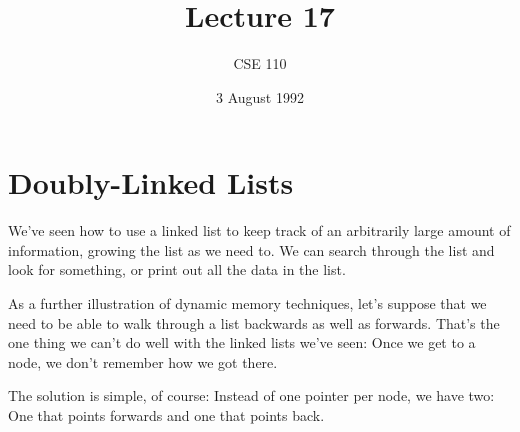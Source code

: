 %
%
%


\def\brac#1{$<${#1}$>$}
\def\Int{{\tt int}}
\def\int{\brac{\Int}}
\def\int{\brac{\Int}}
\def\Shortint{{\tt short~int}}
\def\shortint{\brac{\Shortint}}
\def\Longint{{\tt long~int}}
\def\longint{\brac{\Longint}}
\def\Float{{\tt float}}
\def\float{\brac{\Float}}
\def\Double{{\tt double}}
\def\double{\brac{\Double}}
\def\Char{{\tt char}}
\def\chr{\brac{\Char}}
\def\Void{{\tt void}}
\def\void{\brac{\Void}}

\def\ptr#1{pointer~to {#1}}
\def\p2#1{\brac{\ptr{#1}}}
\def\Ano#1#2{array~of {#1}~{#2}s}
\def\ano#1#2{\brac{\Ano{#1}{#2}}}
\def\Ao#1{array~of {#1}}
\def\ao#1{\brac{\Ao#1}}

\def\np{{\tt NULL} pointer}

\def\breakhere{\mbox{$\otimes$}}


\title{Lecture 17}
\author{CSE 110}
\date{3 August 1992}

\parskip 8pt

\pagestyle{fancy}
\rhead{\thepage}
\cfoot{}




\maketitle

\section{Doubly-Linked Lists}

We've seen how to use a linked list to keep track of an arbitrarily
large amount of information, growing the list as we need to.  We can
search through the list and look for something, or print out all the
data in the list.

As a further illustration of dynamic memory techniques, let's suppose
that we need to be able to walk through a list backwards as well as
forwards.  That's the one thing we can't do well with the linked lists
we've seen:  Once we get to a node, we don't remember how we got there. 

The solution is simple, of course:  Instead of one pointer per node, we
have two:  One that points forwards and one that points back.  


